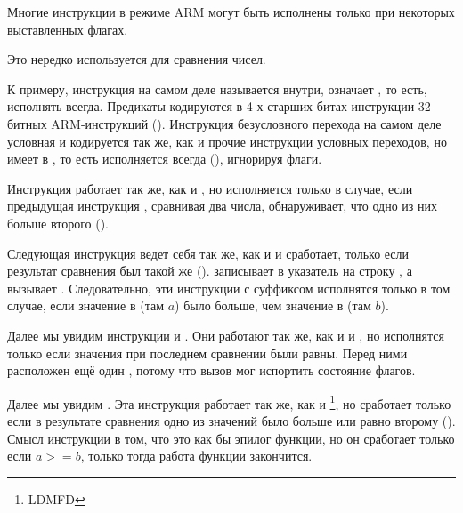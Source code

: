 \label{subsec:jcc_ARM}

\mysubparagraph{\OptimizingKeilVI (\ARMMode)}



Многие инструкции в режиме ARM могут быть исполнены только при некоторых выставленных флагах.

Это нередко используется для сравнения чисел.

К примеру, инструкция \ADD на самом деле называется  внутри,  означает , то есть, исполнять всегда.
Предикаты кодируются в 4-х старших битах инструкции 32-битных ARM-инструкций ().
Инструкция безусловного перехода  на самом деле условная и кодируется так же, 
как и прочие инструкции условных переходов, но имеет  в , 
то есть исполняется всегда (), игнорируя флаги.

Инструкция  работает так же, как и , но исполняется только в случае,
если предыдущая инструкция \CMP,
сравнивая два числа, обнаруживает, что одно из них больше второго ().

Следующая инструкция  ведет себя так же, как и  и сработает, только если 
результат сравнения был такой же ().
 записывает в  указатель на строку  , а  вызывает \printf.
Следовательно, эти инструкции с суффиксом  исполнятся только в том случае, если значение
в  (там $a$) было больше, чем значение в  (там $b$).

Далее мы увидим инструкции  и .
Они работают так же, как и  и , но исполнятся только если значения при последнем сравнении были равны.
Перед ними расположен ещё один \CMP, потому что вызов \printf мог испортить состояние флагов.

Далее мы увидим . Эта инструкция работает так же, как и \footnote{\ac{LDMFD}}, 
но сработает только если в результате сравнения одно из значений было больше или равно второму ().
Смысл инструкции  
в том, что это как бы эпилог функции, но он сработает только если $a>=b$, только тогда работа 
функции закончится.

